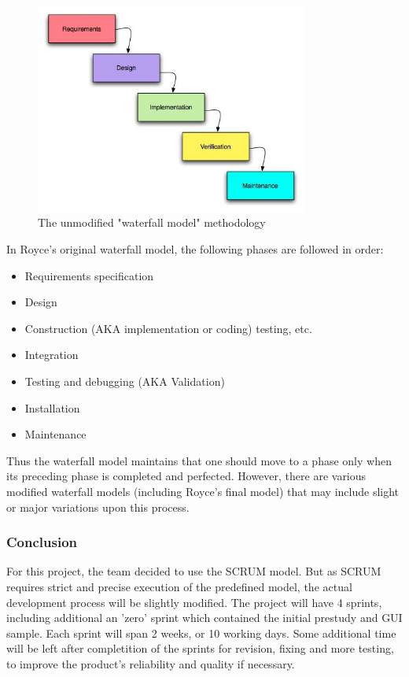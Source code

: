 \begin{figure}[htb]
	\centering
	\includegraphics[width=0.8\textwidth]{process/development_process/waterfall.jpg}
	\caption{The unmodified "waterfall model" methodology\cite{worldpress:waterfall}}
	\label{fig:waterfall-model}
\end{figure}

In Royce's original waterfall model, the following phases are followed in order:

\begin{itemize}
	\item Requirements specification
	\item Design
	\item Construction (AKA implementation or coding) testing, etc.
	\item Integration
	\item Testing and debugging (AKA Validation)
	\item Installation
	\item Maintenance
\end{itemize}

Thus the waterfall model maintains that one should move to a phase only when its preceding phase is 
completed and perfected. However, there are various modified waterfall models (including Royce's final model) 
that may include slight or major variations upon this process.\newline\newline

\subsubsection{Conclusion}
For this project, the team decided to use the SCRUM model. But as SCRUM requires strict and precise
execution of the predefined model, the actual development process will be slightly modified. 
The project will have 4 sprints, including additional an 'zero' sprint which contained the initial
prestudy and GUI sample. Each sprint will span 2 weeks, or 10 working days. 
Some additional time will be left after completition of the sprints for revision, 
fixing and more testing, to improve the product's reliability and quality if necessary.
